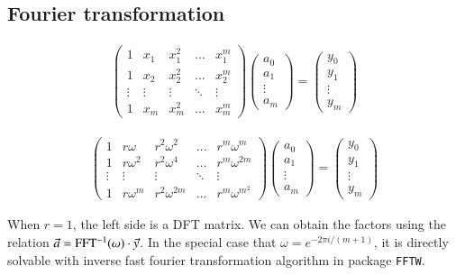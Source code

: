 \documentclass{article}
\newcommand{\<}{\langle}
\renewcommand{\>}{\rangle}
\theoremstyle{definition}\newtheorem{definition}{\textit{Definition}}
\begin{document}
\subsection{Fourier transformation}
\begin{align}
\left(\begin{matrix}
1 & x_1 & x_1^2 & \ldots & x_1^m \\
1 & x_2 & x_2^2 & \ldots & x_2^m \\
\vdots & \vdots & \vdots &\ddots & \vdots \\
1 & x_m & x_m^2 & \ldots & x_m^m
\end{matrix}\right)
\left(\begin{matrix}
a_0 \\ a_1 \\ \vdots \\ a_m
\end{matrix}\right)
= \left(\begin{matrix}
y_0 \\ y_1 \\ \vdots \\ y_m
\end{matrix}\right)
\end{align}

\begin{align}
\left(\begin{matrix}
1 & r\omega & r^2\omega^2 & \ldots & r^m\omega^m \\
1 & r\omega^2 & r^2\omega^4 & \ldots & r^m\omega^{2m} \\
\vdots & \vdots & \vdots &\ddots & \vdots \\
1 & r\omega^m & r^2\omega^{2m} & \ldots & r^m\omega^{m^2}
\end{matrix}\right)
\left(\begin{matrix}
a_0 \\ a_1 \\ \vdots \\ a_m
\end{matrix}\right)
= \left(\begin{matrix}
y_0 \\ y_1 \\ \vdots \\ y_m
\end{matrix}\right)
\end{align}

When $r=1$, the left side is a DFT matrix. We can obtain the factors using the relation $\vec a = {\rm FFT^{-1}}(\omega) \cdot \vec y$.
In the special case that $\omega = e^{-2\pi i/(m+1)}$, it is directly solvable with inverse fast fourier transformation algorithm in package \texttt{FFTW}.
\end{document}
